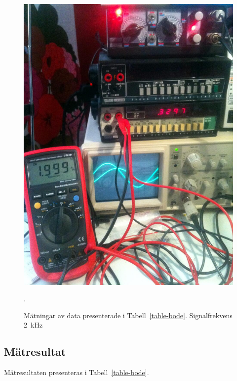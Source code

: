 \begin{figure}
  \centering
  \includegraphics[width=\linewidth]{img/bode_2000Hz.jpg}
  \caption[] {Mätningar av data presenterade i Tabell~\ref{table-bode}.
              Signalfrekvens \SI{2}{\kHz}}.
  \label{fig:bode-foto-2000}
\end{figure}


\subsection{Mätresultat}
Mätresultaten presenteras i Tabell~\ref{table-bode}.

